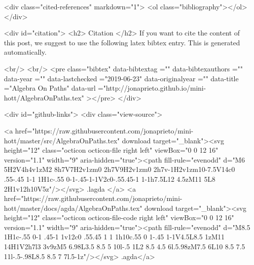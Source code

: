   <div class="cited-references" markdown="1">
  <ol class="bibliography"></ol>
  </div>


  
  <div id="citation">
  <h2> Citation </h2>
  If you want to cite the content of this post,
  we suggest to use the following latex bibtex entry.
  This is generated automatically.

  <br/>
  <br/>
  <pre class="bibtex"
       data-bibtextag =""
       data-bibtexauthors =""
       data-year =""
       data-lastchecked ="2019-06-23"
       data-originalyear =""
       data-title ="Algebra On Paths"
       data-url ="http://jonaprieto.github.io/mini-hott/AlgebraOnPaths.tex"
  ></pre>
  </div>
  

  <div id="github-links">
    <div class="view-source">
      
        <a href="https://raw.githubusercontent.com/jonaprieto/mini-hott/master/src/AlgebraOnPaths.tex" download target="_blank"><svg height="12" class="octicon octicon-file right left" viewBox="0 0 12 16" version="1.1" width="9" aria-hidden="true"><path fill-rule="evenodd" d="M6 5H2V4h4v1zM2 8h7V7H2v1zm0 2h7V9H2v1zm0 2h7v-1H2v1zm10-7.5V14c0 .55-.45 1-1 1H1c-.55 0-1-.45-1-1V2c0-.55.45-1 1-1h7.5L12 4.5zM11 5L8 2H1v12h10V5z"/></svg> .lagda </a>
        <a href="https://raw.githubusercontent.com/jonaprieto/mini-hott/master/docs/agda/AlgebraOnPaths.tex" download target="_blank"><svg height="12" class="octicon octicon-file-code right left" viewBox="0 0 12 16" version="1.1" width="9" aria-hidden="true"><path fill-rule="evenodd" d="M8.5 1H1c-.55 0-1 .45-1 1v12c0 .55.45 1 1 1h10c.55 0 1-.45 1-1V4.5L8.5 1zM11 14H1V2h7l3 3v9zM5 6.98L3.5 8.5 5 10l-.5 1L2 8.5 4.5 6l.5.98zM7.5 6L10 8.5 7.5 11l-.5-.98L8.5 8.5 7 7l.5-1z"/></svg> .agda</a>
      
